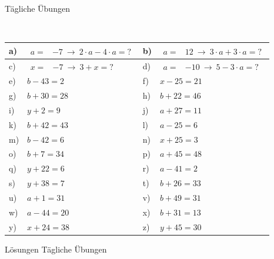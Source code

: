 \documentclass[12pt]{article}
\begin{document}
\centerline{{\Large Tägliche Übungen}} 
\vspace{1cm}
\noindent \\


\begin{xltabular}{\textwidth}{|C{0.75cm}|X|C{0.75cm}|X|}
\hline
a)&$\begin{aligned}
 a=&-7~ \rightarrow ~ 2 \cdot a - 4 \cdot a=?
\end{aligned}$
&
b)&$\begin{aligned}
 a=&12~ \rightarrow ~ 3 \cdot a + 3 \cdot a=?
\end{aligned}$
\\\hline
c)&$\begin{aligned}
 x=&-7~ \rightarrow ~ 3 + x=?
\end{aligned}$
&
d)&$\begin{aligned}
 a=&-10~ \rightarrow ~ 5 - 3 \cdot a=?
\end{aligned}$
\\\hline
e)&$b-43 = 2$
&
f)&$x-25 = 21$
\\\hline
g)&$b+30 = 28$
&
h)&$b+22 = 46$
\\\hline
i)&$y+2 = 9$
&
j)&$a+27 = 11$
\\\hline
k)&$b+42 = 43$
&
l)&$a-25 = 6$
\\\hline
m)&$b-42 = 6$
&
n)&$x+25 = 3$
\\\hline
o)&$b+7 = 34$
&
p)&$a+45 = 48$
\\\hline
q)&$y+22 = 6$
&
r)&$a-41 = 2$
\\\hline
s)&$y+38 = 7$
&
t)&$b+26 = 33$
\\\hline
u)&$a+1 = 31$
&
v)&$b+49 = 31$
\\\hline
w)&$a-44 = 20$
&
x)&$b+31 = 13$
\\\hline
y)&$x+24 = 38$
&
z)&$y+45 = 30$
\\\hline
\end{xltabular}
\vspace{0.5cm}
\newpage
{}
\centerline{{\large Lösungen Tägliche Übungen}} 
\vspace{0.5cm}
\end{document}
